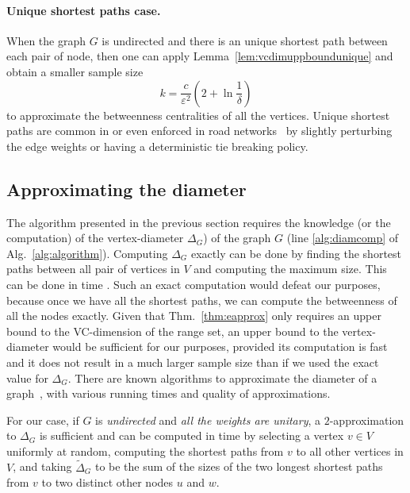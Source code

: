 \paragraph{Unique shortest paths case.} When the graph $G$ is undirected and
there is an unique shortest path between each pair of node, then one can apply
Lemma~\ref{lem:vcdimuppboundunique} and obtain a smaller sample size
\[ k= \frac{c}{\varepsilon^2}\left(2+\ln\frac{1}{\delta}\right)
\]
to approximate the betweenness centralities of all the vertices. Unique shortest
paths are common in or even enforced in road networks~\citep{GeisbergerSS08} by
slightly perturbing the edge weights or having a deterministic tie breaking
policy.

\subsection{Approximating the diameter}\label{sec:diam}
The algorithm presented in the previous section requires the knowledge (or the
computation) of the vertex-diameter $\Delta_G$) of the graph $G$ (line
\ref{alg:diamcomp} of Alg.~\ref{alg:algorithm}). Computing $\Delta_G$ exactly
can be done by finding the shortest paths between all pair of vertices in $V$
and computing the maximum size. This can be done in time \XXX. Such an exact
computation would defeat our purposes, because once we have all the shortest
paths, we can compute the betweenness of all the nodes exactly. Given that
Thm.~\ref{thm:eapprox} only requires an upper bound to the VC-dimension of the
range set, an upper bound to the vertex-diameter would be sufficient for our
purposes, provided its computation is fast and it does not result in a much
larger sample size than if we used the exact value for $\Delta_G$. There are
known algorithms to approximate the diameter of a
graph~\citep{AingwordCIM99,BoitmanisFL06,RodittyW12}, with various running times
and quality of approximations.

For our case, if $G$ is \emph{undirected} and \emph{all the weights are
unitary}, a $2$-approximation to $\Delta_G$ is sufficient and can be computed in
time \XXX by selecting a vertex $v\in V$ uniformly at random, computing the
shortest paths from $v$ to all other vertices in $V$, and taking
$\tilde\Delta_G$ to be the sum of the sizes of the two longest shortest paths
from $v$ to two distinct other nodes $u$ and $w$. 

